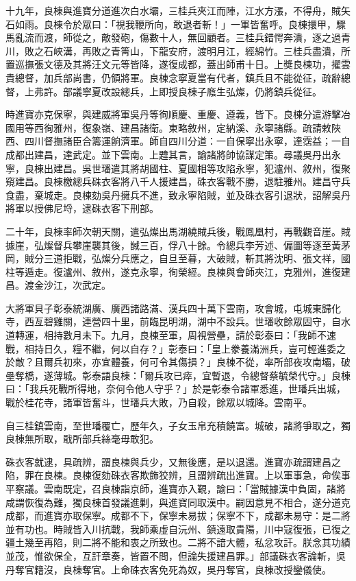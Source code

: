 \begin{pinyinscope}
十九年，良棟與進寶分道進次白水壩，三桂兵夾江而陣，江水方漲，不得舟，賊矢石如雨。良棟令於眾曰：「視我鞭所向，敢退者斬！」一軍皆奮呼。良棟擐甲，驟馬亂流而渡，師從之，敵發砲，傷數十人，無回顧者。三桂兵錯愕奔潰，逐之過青川，敗之石峽溝，再敗之青箐山，下龍安府，渡明月江，經綿竹。三桂兵盡潰，所置巡撫張文德及其將汪文元等皆降，遂復成都，蓋出師甫十日。上獎良棟功，擢雲貴總督，加兵部尚書，仍領將軍。良棟念寧夏當有代者，鎮兵且不能從征，疏辭總督，上弗許。部議寧夏改設總兵，上即授良棟子廕生弘燦，仍將鎮兵從征。

時進寶亦克保寧，與建威將軍吳丹等徇順慶、重慶、遵義，皆下。良棟分遣游擊冶國用等西徇雅州，復象嶺、建昌諸衛。東略敘州，定納溪、永寧諸縣。疏請敕陜西、四川督撫諸臣合籌運餉濟軍。師自四川分道：一自保寧出永寧，達霑益；一自成都出建昌，達武定。並下雲南。上韙其言，諭諸將帥協謀定策。尋議吳丹出永寧，良棟出建昌。吳世璠遣其將胡國柱、夏國相等攻陷永寧，犯瀘州、敘州，復聚窺建昌。良棟檄總兵硃衣客將八千人援建昌，硃衣客戰不勝，退駐雅州。建昌守兵食盡，棄城走。良棟劾吳丹擁兵不進，致永寧陷賊，並及硃衣客引退狀，詔解吳丹將軍以授佛尼埒，逮硃衣客下刑部。

二十年，良棟率師次朝天關，遣弘燦出馬湖繞賊兵後，戰鳳凰村，再戰觀音崖。賊據崖，弘燦督兵攀崖襲其後，馘三百，俘八十餘。令總兵李芳述、偏圖等逐至黃茅岡，賊分三道拒戰，弘燦分兵應之，自旦至暮，大破賊，斬其將沈明、張文祥，國柱等遁走。復瀘州、敘州，遂克永寧，徇榮經。良棟與會師夾江，克雅州，進復建昌。渡金沙江，次武定。

大將軍貝子彰泰統湖廣、廣西諸路滿、漢兵四十萬下雲南，攻會城，屯城東歸化寺，西亙碧雞關，連營四十里，前臨昆明湖，湖中不設兵。世璠收餘眾固守，自水道轉運，相持數月未下。九月，良棟至軍，周視營壘，請於彰泰曰：「我師不速戰，相持日久，糧不繼，何以自存？」彰泰曰：「皇上豢養滿洲兵，豈可輕進委之於敵？且爾兵初來，亦宜體養，何可令其傷損？」良棟不從，率所部夜攻南壩，破壘奪橋，遂薄城。彰泰語良棟：「爾兵攻已瘁，宜暫退，令總督蔡毓榮代守。」良棟曰：「我兵死戰所得地，奈何令他人守乎？」於是彰泰令諸軍悉進，世璠兵出城，戰於桂花寺，諸軍皆奮斗，世璠兵大敗，乃自殺，餘眾以城降。雲南平。

自三桂鎮雲南，至世璠覆亡，歷年久，子女玉帛充積饒富。城破，諸將爭取之，獨良棟無所取，戢所部兵絲毫毋敢犯。

硃衣客就逮，具疏辨，謂良棟與兵少，又無後應，是以退還。進寶亦疏謂建昌之陷，罪在良棟。良棟復劾硃衣客欺飾狡辨，且謂辨疏出進寶。上以軍事急，命俟事平察議。雲南既定，召良棟詣京師，進寶亦入覲，諭曰：「當賊據漢中負固，諸將咸謂恢復為難，獨良棟首發議進剿，與進寶同取漢中。嗣因意見不相合，遂分道克成都，而進寶亦取保寧。成都不下，保寧未易拔；保寧不下，成都未易守：是二將並有功也。時賊皆入川抗戰，我師乘虛自沅州、鎮遠取貴陽，川中寇復張，已復之疆土幾至再陷，則二將不能和衷之所致也。二將不諳大體，私忿攻訐。朕念其功績並茂，惟欲保全，互訐章奏，皆置不問，但論失援建昌罪。」部議硃衣客論斬，吳丹奪官籍沒，良棟奪官。上命硃衣客免死為奴，吳丹奪官，良棟改授鑾儀使。


\end{pinyinscope}
